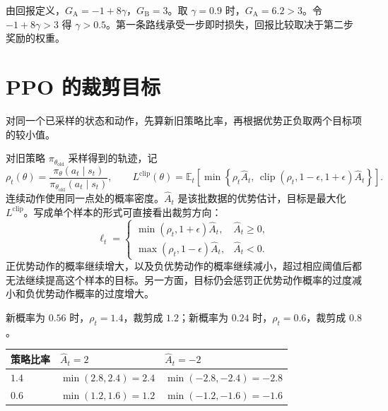
\sol 由回报定义，$G_{\mathrm{A}}=-1+8\gamma$，$G_{\mathrm{B}}=3$。取 $\gamma=0.9$ 时，$G_{\mathrm{A}}=6.2>3$。令 $-1+8\gamma>3$ 得 $\gamma>0.5$。第一条路线承受一步即时损失，回报比较取决于第二步奖励的权重。

\section{PPO 的裁剪目标}

 \quad 对同一个已采样的状态和动作，先算新旧策略比率，再根据优势正负取两个目标项的较小值。

对旧策略 $\pi_{\theta_{\mathrm{old}}}$ 采样得到的轨迹，记
\[
\rho_t(\theta)=
\frac{\pi_\theta(a_t\mid s_t)}{\pi_{\theta_{\mathrm{old}}}(a_t\mid s_t)},\qquad
L^{\mathrm{clip}}(\theta)
=\mathbb E_t\!\left[
  \min\!\left\{\rho_t\widehat A_t,\,
  \operatorname{clip}(\rho_t,1-\epsilon,1+\epsilon)\widehat A_t\right\}
\right].
\]
连续动作使用同一点处的概率密度。$\widehat A_t$ 是该批数据的优势估计，目标是最大化 $L^{\mathrm{clip}}$。写成单个样本的形式可直接看出裁剪方向：
\[
\ell_t=
\begin{cases}
  \min(\rho_t,1+\epsilon)\widehat A_t,&\widehat A_t\ge 0,\\[2pt]
  \max(\rho_t,1-\epsilon)\widehat A_t,&\widehat A_t<0.
\end{cases}
\]
正优势动作的概率继续增大，以及负优势动作的概率继续减小，超过相应阈值后都无法继续提高这个样本的目标。另一方面，目标仍会惩罚正优势动作概率的过度减小和负优势动作概率的过度增大。


\sol 新概率为 $0.56$ 时，$\rho_t=1.4$，裁剪成 $1.2$；新概率为 $0.24$ 时，$\rho_t=0.6$，裁剪成 $0.8$。
\begin{center}
\begin{tabular}{@{}lll@{}}
\toprule
策略比率 & $\widehat A_t=2$ & $\widehat A_t=-2$ \\
\midrule
$1.4$ & $\min(2.8,2.4)=2.4$ & $\min(-2.8,-2.4)=-2.8$ \\
$0.6$ & $\min(1.2,1.6)=1.2$ & $\min(-1.2,-1.6)=-1.6$ \\
\bottomrule
\end{tabular}
\end{center}

